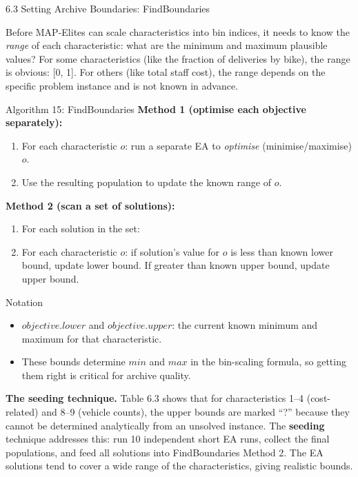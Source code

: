 \documentclass[aspectratio=169,10pt]{beamer}
\begin{document}
\begin{frame}[allowframebreaks]{6.3 Setting Archive Boundaries: FindBoundaries}

Before MAP-Elites can scale characteristics into bin indices, it needs
to know the \emph{range} of each characteristic: what are the minimum
and maximum plausible values?
For some characteristics (like the fraction of deliveries by bike),
the range is obvious: [0, 1].
For others (like total staff cost), the range depends on the specific
problem instance and is not known in advance.

\medskip
\begin{block}{Algorithm 15: FindBoundaries}
\textbf{Method 1 (optimise each objective separately):}
\begin{enumerate}
  \item For each characteristic $o$:
        run a separate EA to \emph{optimise} (minimise/maximise) $o$.
  \item Use the resulting population to update the known range of $o$.
\end{enumerate}
\textbf{Method 2 (scan a set of solutions):}
\begin{enumerate}
  \item For each solution in the set:
  \item For each characteristic $o$:
        if solution's value for $o$ is less than known lower bound,
        update lower bound.
        If greater than known upper bound, update upper bound.
\end{enumerate}
\end{block}

\medskip
\begin{block}{Notation}
\begin{itemize}
  \item $objective.lower$ and $objective.upper$: the current known
        minimum and maximum for that characteristic.
  \item These bounds determine $min$ and $max$ in the bin-scaling
        formula, so getting them right is critical for archive quality.
\end{itemize}
\end{block}

\framebreak

\textbf{The seeding technique.}
Table 6.3 shows that for characteristics 1--4 (cost-related) and 8--9
(vehicle counts), the upper bounds are marked ``?'' because they
cannot be determined analytically from an unsolved instance.
The \textbf{seeding} technique addresses this: run 10 independent
short EA runs, collect the final populations, and feed all solutions
into FindBoundaries Method 2.
The EA solutions tend to cover a wide range of the characteristics,
giving realistic bounds.


\end{frame}
\end{document}
